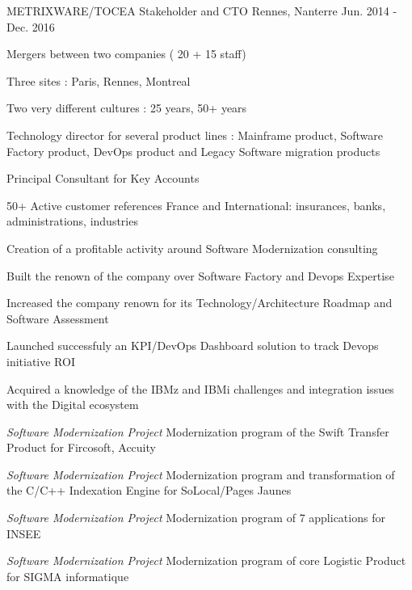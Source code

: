 \begin{cventries}
    \cventry
    {METRIXWARE/TOCEA} %
    {Stakeholder and CTO} %
    {Rennes, Nanterre} %
    {Jun. 2014 - Dec. 2016} %
    {
        \experience
        {
            \begin{cvitems} %
                \item{Mergers between two companies ( 20 + 15 staff)}
                \item{Three sites : Paris, Rennes, Montreal}
                \item{Two very different cultures : 25 years, 50+ years}
                \item{Technology director for several product lines : Mainframe product, Software Factory product, DevOps product and Legacy Software migration products}
                \item{Principal Consultant for Key Accounts}
                \item{50+ Active customer references France and International: insurances, banks, administrations, industries}
            \end{cvitems}
        }
        {
            \begin{cvitems} %
            \item{ Creation of a profitable activity around Software Modernization consulting}
            \item{ Built the renown of the company over Software Factory and Devops Expertise}
            \item{ Increased the company renown for its Technology/Architecture Roadmap and Software Assessment}
            \item{ Launched successfuly an KPI/DevOps Dashboard solution to track Devops initiative ROI}
            \item{ Acquired a knowledge of the IBMz and IBMi challenges and integration issues with the Digital ecosystem}
            \item{\emph{Software Modernization Project} Modernization program of the Swift Transfer Product for Fircosoft, Accuity}
            \item{\emph{Software Modernization Project} Modernization program and transformation of the C/C++ Indexation Engine for SoLocal/Pages Jaunes}
            \item{\emph{Software Modernization Project} Modernization program of 7 applications for INSEE}
            \item{\emph{Software Modernization Project} Modernization program of core Logistic Product for SIGMA informatique}

\end{cvitems}}}
\end{cventries}
